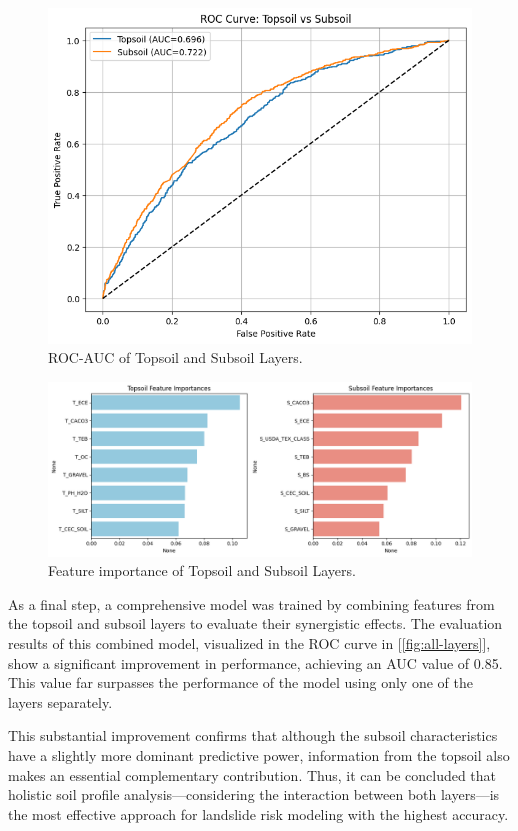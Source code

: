 \begin{figure}[htbp]
    \centerline{\includegraphics[width=\linewidth]{fig7.png}}
    \caption{ROC-AUC of Topsoil and Subsoil Layers.}
    \label{fig:sub-top}
\end{figure}
\begin{figure}[htbp]
    \centerline{\includegraphics[width=\linewidth]{fig8.png}}
    \caption{Feature importance of Topsoil and Subsoil Layers.}
    \label{fig:feature-importance-top-sub}
\end{figure}

As a final step, a comprehensive model was trained by combining features from the topsoil and subsoil layers to evaluate their synergistic effects. The evaluation results of this combined model, visualized in the ROC curve in [\ref{fig:all-layers}], show a significant improvement in performance, achieving an AUC value of 0.85. This value far surpasses the performance of the model using only one of the layers separately.

This substantial improvement confirms that although the subsoil characteristics have a slightly more dominant predictive power, information from the topsoil also makes an essential complementary contribution. Thus, it can be concluded that holistic soil profile analysis---considering the interaction between both layers---is the most effective approach for landslide risk modeling with the highest accuracy.

